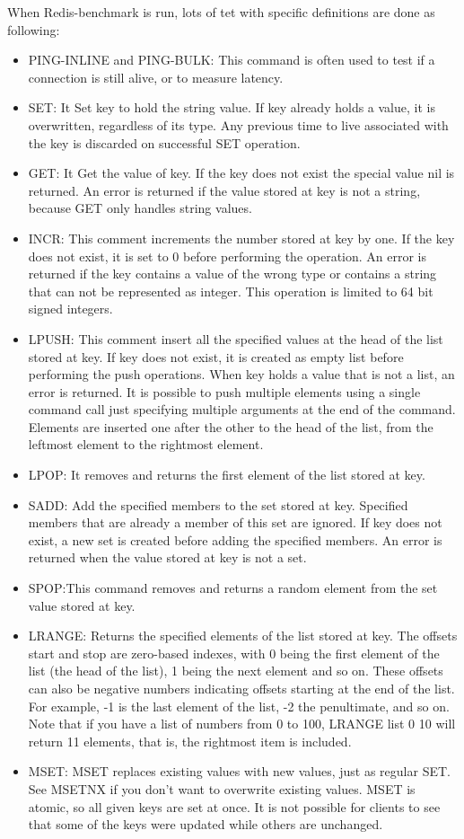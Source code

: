 \documentclass[10pt, conference]{IEEEtran}
\begin{document}
\indent When Redis-benchmark is run, lots of tet with specific definitions are done as following:

\begin{itemize}

\item PING-INLINE and PING-BULK: This command is often used to test if a connection is still alive, or to measure latency.
\item SET: It Set key to hold the string value. If key already holds a value, it is overwritten, regardless of its type. Any previous time to live associated with the key is discarded on successful SET operation.
\item GET: It Get the value of key. If the key does not exist the special value nil is returned. An error is returned if the value stored at key is not a string, because GET only handles string values.
\item INCR: This comment increments the number stored at key by one. If the key does not exist, it is set to 0 before performing the operation. An error is returned if the key contains a value of the wrong type or contains a string that can not be represented as integer. This operation is limited to 64 bit signed integers.
\item LPUSH: This comment insert all the specified values at the head of the list stored at key. If key does not exist, it is created as empty list before performing the push operations. When key holds a value that is not a list, an error is returned.
It is possible to push multiple elements using a single command call just specifying multiple arguments at the end of the command. Elements are inserted one after the other to the head of the list, from the leftmost element to the rightmost element.
\item LPOP: It removes and returns the first element of the list stored at key.
\item SADD: Add the specified members to the set stored at key. Specified members that are already a member of this set are ignored. If key does not exist, a new set is created before adding the specified members. An error is returned when the value stored at key is not a set.
\item SPOP:This command removes and returns a random element from the set value stored at key.
\item LRANGE: Returns the specified elements of the list stored at key. The offsets start and stop are zero-based indexes, with 0 being the first element of the list (the head of the list), 1 being the next element and so on. These offsets can also be negative numbers indicating offsets starting at the end of the list. For example, -1 is the last element of the list, -2 the penultimate, and so on. Note that if you have a list of numbers from 0 to 100, LRANGE list 0 10 will return 11 elements, that is, the rightmost item is included.
\item MSET:  MSET replaces existing values with new values, just as regular SET. See MSETNX if you don't want to overwrite existing values. MSET is atomic, so all given keys are set at once. It is not possible for clients to see that some of the keys were updated while others are unchanged.
\end{itemize}
\end{document}
